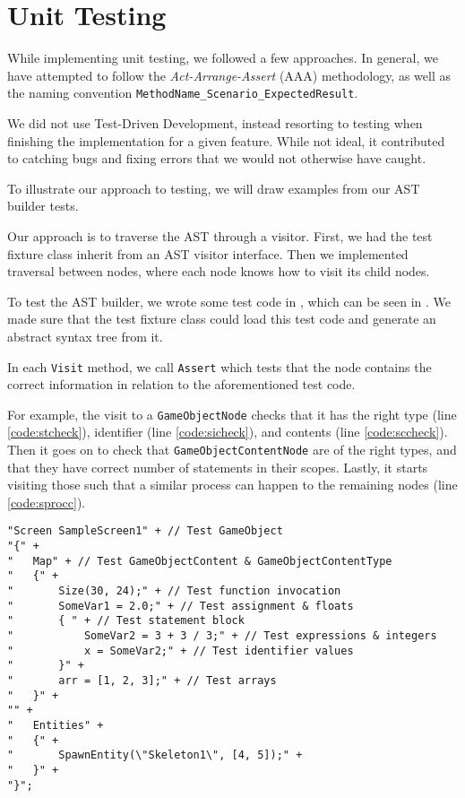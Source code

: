 \section{Unit Testing}
While implementing unit testing, we followed a few approaches.
In general, we have attempted to follow the \textit{Act-Arrange-Assert} (AAA)
methodology, as well as the naming convention 
\texttt{MethodName\_Scenario\_ExpectedResult}.

We did not use Test-Driven Development, instead resorting to testing
when finishing the implementation for a given feature. While not ideal, it
contributed to catching bugs and fixing errors that we would not
otherwise have caught.

To illustrate our approach to testing, we will draw examples from our
AST builder tests.

Our approach is to traverse the AST through a visitor. First,
we had the test fixture class inherit from an AST visitor interface.
Then we implemented traversal between nodes, where each node knows how
to visit its child nodes.

To test the AST builder, we wrote some test code in \dazel{}, which can be seen in . We made sure that
the test fixture class could load this test code and generate an abstract syntax tree from it.

In each \texttt{Visit} method, we call \texttt{Assert} which tests
that the node contains the correct information in relation to the
aforementioned \dazel{} test code.

For example, the visit to a \texttt{GameObjectNode} checks that it has the
right type (line \ref{code:stcheck}), identifier (line \ref{code:sicheck}), and contents (line \ref{code:sccheck}). Then it goes on to check that
\texttt{GameObjectContentNode} are of the right types, and that they have
correct number of statements in their scopes. Lastly, it starts visiting
those such that a similar process can happen to the remaining nodes (line \ref{code:sprocc}).

\begin{lstlisting}[language=CSharp, caption={AST Builder \dazel{} test code.}, label={lst:asttestcode}]
"Screen SampleScreen1" + // Test GameObject
"{" +
"   Map" + // Test GameObjectContent & GameObjectContentType
"   {" +
"       Size(30, 24);" + // Test function invocation
"       SomeVar1 = 2.0;" + // Test assignment & floats
"       { " + // Test statement block
"           SomeVar2 = 3 + 3 / 3;" + // Test expressions & integers
"           x = SomeVar2;" + // Test identifier values
"       }" +
"       arr = [1, 2, 3];" + // Test arrays
"   }" +
"" +
"   Entities" +
"   {" +
"       SpawnEntity(\"Skeleton1\", [4, 5]);" +
"   }" +
"}";
\end{lstlisting}


